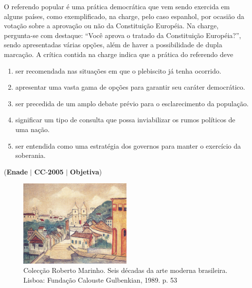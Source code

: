 \documentclass{exam}
\begin{document}
\begin{questions}
O referendo popular é uma prática democrática que vem sendo
exercida em alguns países, como exemplificado, na charge, pelo
caso espanhol, por ocasião da votação sobre a aprovação ou
não da Constituição Européia. Na charge, pergunta-se com
destaque: “Você aprova o tratado da Constituição Européia?”,
sendo apresentadas várias opções, além de haver a
possibilidade de dupla marcação.
A crítica contida na charge indica que a prática do referendo
deve
	\begin{enumerate}[label=\alph*)]
		\item  ser recomendada nas situações em que o plebiscito já tenha
ocorrido.
		\item  apresentar uma vasta gama de opções para garantir seu
caráter democrático.
		\item  ser precedida de um amplo debate prévio para o
esclarecimento da população.
		\item  significar um tipo de consulta que possa inviabilizar os
rumos políticos de uma nação.
		\item  ser entendida como uma estratégia dos governos para
manter o exercício da soberania.
	\end{enumerate}

\question (\textbf{Enade} $|$ \textbf{CC}-\textbf{2005} $|$ \textbf{Objetiva})

\begin{figure}[H]
	\begin{center}
		\includegraphics[width=0.5\textwidth]{CIENCIA_DA_COMPUTACAO_Prova2005-utf8_figuras/fig-0004.jpg}
		\caption{Colecção Roberto Marinho. Seis décadas da arte moderna brasileira. Lisboa: Fundação Calouste Gulbenkian, 1989. p. 53}
	\end{center}
\end{figure}


\end{questions}
\end{document}
